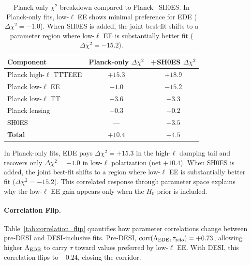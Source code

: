 \documentclass[a4paper,11pt]{article}
\begin{document}
\begin{table}[ht]
\centering
\caption{Planck-only $\chi^2$ breakdown compared to Planck+SH0ES. In Planck-only fits, low-$\ell$ EE shows minimal preference for EDE ($\Delta\chi^2 = -1.0$). When SH0ES is added, the joint best-fit shifts to a parameter region where low-$\ell$ EE is substantially better fit ($\Delta\chi^2 = -15.2$).}
\label{tab:planck_only}
\begin{tabular}{lcc}
\toprule
\textbf{Component} & \textbf{Planck-only $\Delta\chi^2$} & \textbf{+SH0ES $\Delta\chi^2$} \\
\midrule
Planck high-$\ell$ TTTEEE & $+15.3$ & $+18.9$ \\
Planck low-$\ell$ EE & $\mathbf{-1.0}$ & $\mathbf{-15.2}$ \\
Planck low-$\ell$ TT & $-3.6$ & $-3.3$ \\
Planck lensing & $-0.3$ & $-0.2$ \\
SH0ES & --- & $-3.5$ \\
\midrule
\textbf{Total} & $\mathbf{+10.4}$ & $\mathbf{-4.5}$ \\
\bottomrule
\end{tabular}
\end{table}

In Planck-only fits, EDE pays $\Delta\chi^2 = +15.3$ in the high-$\ell$ damping tail and recovers only $\Delta\chi^2 = -1.0$ in low-$\ell$ polarization (net $+10.4$). When SH0ES is added, the joint best-fit shifts to a region where low-$\ell$ EE is substantially better fit ($\Delta\chi^2 = -15.2$). This correlated response through parameter space explains why the low-$\ell$ EE gain appears only when the $H_0$ prior is included.

\paragraph{Correlation Flip.}
\label{sec:correlation_flip}
Table~\ref{tab:correlation_flip} quantifies how parameter correlations change between pre-DESI and DESI-inclusive fits. Pre-DESI, $\mathrm{corr}(\Lambda_{\rm EDE}, \tau_{\rm reio}) = +0.73$, allowing higher $\Lambda_{\rm EDE}$ to carry $\tau$ toward values preferred by low-$\ell$ EE. With DESI, this correlation flips to $-0.24$, closing the corridor.
\end{document}
